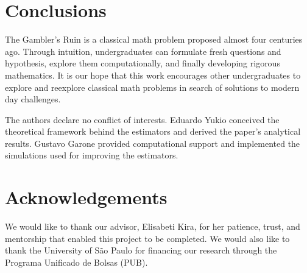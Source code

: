 \documentclass[a4paper,10pt,twocolumn]{article}
\begin{document}
\section{Conclusions}

The Gambler's Ruin is a classical math problem proposed almost four centuries
ago. Through intuition, undergraduates can formulate fresh questions and
hypothesis, explore them computationally, and finally developing rigorous
mathematics. It is our hope that this work encourages other undergraduates to
explore and reexplore classical math problems in search of solutions to modern
day challenges.

The authors declare no conflict of interests. Eduardo Yukio conceived the
theoretical framework behind the estimators and derived the paper's analytical
results. Gustavo Garone provided computational support and implemented the
simulations used for improving the estimators.

\section{Acknowledgements}

We would like to thank our advisor, Elisabeti Kira, for her patience, trust, and
mentorship that enabled this project to be completed. We would also like to thank
the University of São Paulo for financing our research through the Programa
Unificado de Bolsas (PUB).

\vspace{0.5cm}


\end{document}
